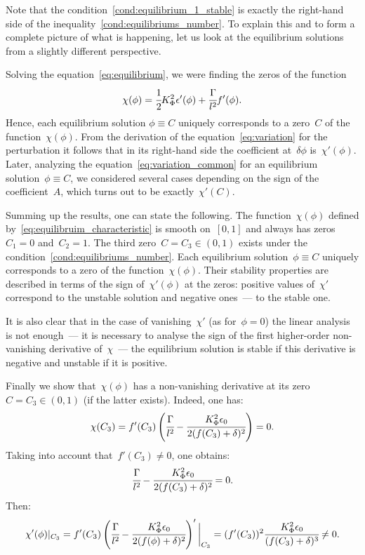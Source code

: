 Note that the condition~\eqref{cond:equilibrium_1_stable} is exactly the
right-hand side of the inequality~\eqref{cond:equilibriums_number}.
To explain this and to form a complete picture of what is happening,
let us look at the equilibrium solutions from a slightly different
perspective.

Solving the equation~\eqref{eq:equilibrium}, we were finding the zeros of
the function
\begin{equation}
	\chi(\phi) = \cfrac{1}{2} K_\Phi^2 \epsilon'(\phi) + \cfrac{\Gamma}{l^2} f'(\phi) {\text{.}}
	\label{eq:equilibruim_characteristic}
\end{equation}
Hence, each equilibrium solution $\phi \equiv C$ uniquely
corresponds to a zero~$C$ of the function~$\chi(\phi)$.
From the derivation of the equation~\eqref{eq:variation} for the perturbation
it follows that in its right-hand side the coefficient at~$\delta
\phi$ is~$\chi'(\phi)$.
Later, analyzing the equation~\eqref{eq:variation_common} for an equilibrium
solution~$\phi \equiv C$, we considered several cases depending on the
sign of the coefficient~$A$, which turns out to be exactly~$\chi'(C)$.


Summing up the results, one can state the following.
The function~$\chi(\phi)$ defined by~\eqref{eq:equilibruim_characteristic}
is smooth on~$[0, 1]$ and always has zeros~$C_1=0$ and~$C_2=1$.
The third zero~$C=C_3\in (0, 1)$ exists under the
condition~\eqref{cond:equilibriums_number}.
Each equilibrium solution~$\phi \equiv C$ uniquely corresponds to a zero
of the function~$\chi(\phi)$. Their stability properties are
described in terms of the sign of~$\chi'(\phi)$ at the zeros: positive
values of~$\chi'$
correspond to the unstable solution and negative ones~---
to the stable one.

It is also clear that in the case of vanishing~$\chi'$
(as for~$\phi = 0$) the linear analysis is not enough~---
it is necessary to analyse the sign of the first higher-order
non-vanishing
derivative of~$\chi$~--- the equilibrium solution is stable if
this derivative is negative and unstable if it is positive.


Finally we show that~$\chi(\phi)$ has a non-vanishing derivative at its
zero~$C=C_3 \in (0, 1)$ (if the latter exists).
Indeed, one has:
$$\chi(C_3) = f'(C_3) \left( \cfrac{\Gamma}{l^2} - \cfrac{K_\Phi^2 \epsilon_0}{2 (f(C_3) + \delta)^2} \right) = 0 {\text{.}}$$
Taking into account that~$f'(C_3) \ne 0$, one obtains:
$$\cfrac{\Gamma}{l^2} - \cfrac{K_\Phi^2 \epsilon_0}{2 (f(C_3) + \delta)^2} = 0 {\text{.}}$$
Then:
$$\chi'(\phi)|_{C_3} = f'(C_3) \left( \cfrac{\Gamma}{l^2} - \cfrac{K_\Phi^2 \epsilon_0}{2 (f(\phi) + \delta)^2} \right) ' \bigg|_{C_3} = (f'(C_3))^2 \cfrac{K_\Phi^2 \epsilon_0}{(f(C_3) + \delta)^3} \ne 0 {\text{.}}$$

